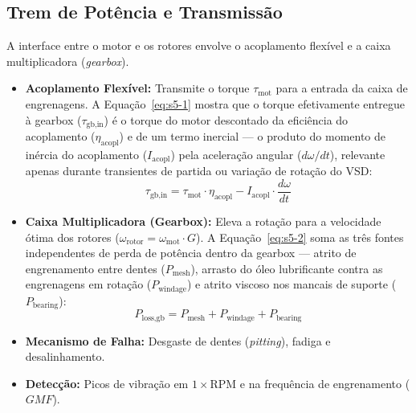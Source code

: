 \documentclass[12pt,a4paper]{article}
\numberwithin{equation}{section}
\numberwithin{table}{section}
\numberwithin{figure}{section}
\begin{document}
	\subsection{\textbf{Trem de Potência e Transmissão}}
	A interface entre o motor e os rotores envolve o acoplamento flexível e a caixa multiplicadora (\textit{gearbox}).
	\begin{itemize}
		\item \textbf{Acoplamento Flexível:} Transmite o torque $\tau_{\text{mot}}$ para a entrada da caixa de engrenagens. A Equação~\eqref{eq:s5-1} mostra que o torque efetivamente entregue à gearbox ($\tau_{\text{gb,in}}$) é o torque do motor descontado da eficiência do acoplamento ($\eta_{\text{acopl}}$) e de um termo inercial — o produto do momento de inércia do acoplamento ($I_{\text{acopl}}$) pela aceleração angular ($d\omega/dt$), relevante apenas durante transientes de partida ou variação de rotação do VSD:
		\begin{equation}\label{eq:s5-1}
 \tau_{\text{gb,in}} = \tau_{\text{mot}} \cdot \eta_{\text{acopl}} - I_{\text{acopl}} \cdot \frac{d\omega}{dt}
\end{equation}
		\item \textbf{Caixa Multiplicadora (Gearbox):} Eleva a rotação para a velocidade ótima dos rotores ($\omega_{\text{rotor}} = \omega_{\text{mot}} \cdot G$). A Equação~\eqref{eq:s5-2} soma as três fontes independentes de perda de potência dentro da gearbox — atrito de engrenamento entre dentes ($P_{\text{mesh}}$), arrasto do óleo lubrificante contra as engrenagens em rotação ($P_{\text{windage}}$) e atrito viscoso nos mancais de suporte ($P_{\text{bearing}}$):
		\begin{equation}\label{eq:s5-2}
 P_{\text{loss,gb}} = P_{\text{mesh}} + P_{\text{windage}} + P_{\text{bearing}}
\end{equation}
		\item \textbf{Mecanismo de Falha:} Desgaste de dentes (\textit{pitting}), fadiga e desalinhamento.
		\item \textbf{Detecção:} Picos de vibração em $1 \times \text{RPM}$ e na frequência de engrenamento ($GMF$).
	\end{itemize}
	
\end{document}
